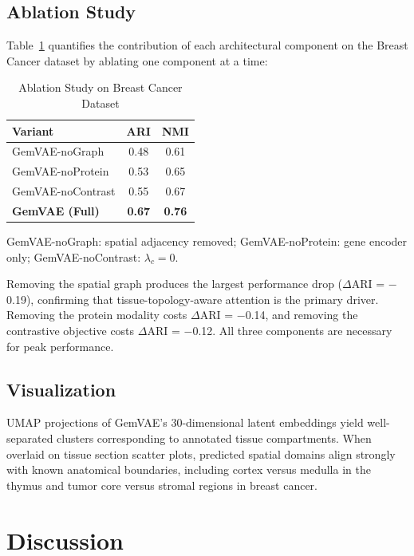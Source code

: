 \documentclass[conference]{IEEEtran}
\begin{document}
\subsection{Ablation Study}

Table~\ref{tab:ablation} quantifies the contribution of each architectural component on the Breast Cancer dataset by ablating one component at a time:

\begin{table}[htbp]
\caption{Ablation Study on Breast Cancer Dataset}
\begin{center}
\begin{tabular}{|l|c|c|}
\hline
\textbf{Variant} & \textbf{ARI} & \textbf{NMI} \\
\hline
GemVAE-noGraph    & 0.48 & 0.61 \\
GemVAE-noProtein  & 0.53 & 0.65 \\
GemVAE-noContrast & 0.55 & 0.67 \\
\textbf{GemVAE (Full)} & \textbf{0.67} & \textbf{0.76} \\
\hline
\end{tabular}
\label{tab:ablation}
\end{center}
\small{GemVAE-noGraph: spatial adjacency removed; GemVAE-noProtein: gene encoder only; GemVAE-noContrast: $\lambda_c = 0$.}
\end{table}

Removing the spatial graph produces the largest performance drop ($\Delta$ARI = $-$0.19), confirming that tissue-topology-aware attention is the primary driver. Removing the protein modality costs $\Delta$ARI = $-$0.14, and removing the contrastive objective costs $\Delta$ARI = $-$0.12. All three components are necessary for peak performance.

\subsection{Visualization}

UMAP projections of GemVAE's 30-dimensional latent embeddings yield well-separated clusters corresponding to annotated tissue compartments. When overlaid on tissue section scatter plots, predicted spatial domains align strongly with known anatomical boundaries, including cortex versus medulla in the thymus and tumor core versus stromal regions in breast cancer.

\section{Discussion}
\end{document}
